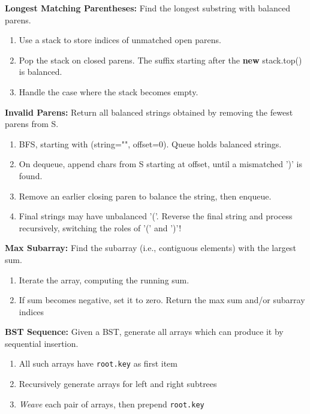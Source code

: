 \documentclass[12pt]{article}
\begin{document}
\vspace{5mm}
\noindent
\textbf{Longest Matching Parentheses:}
Find the longest substring with balanced parens.
\begin{enumerate}
\item Use a stack to store indices of unmatched open parens.
\item Pop the stack on closed parens. The suffix starting after the \textbf{new} stack.top() is balanced.
\item Handle the case where the stack becomes empty.
\end{enumerate}


\vspace{5mm}
\noindent
\textbf{Invalid Parens:}
Return all balanced strings obtained by removing the fewest parens from S.
\begin{enumerate}
\item BFS, starting with (string="", offset=0). Queue holds balanced strings.
\item On dequeue, append chars from S starting at offset, until a mismatched ')' is found.
\item Remove an earlier closing paren to balance the string, then enqueue.
\item Final strings may have unbalanced '('. Reverse the final string and process recursively,
switching the roles of '(' and ')'!
\end{enumerate}


\vspace{5mm}
\noindent
\textbf{Max Subarray:}
Find the subarray (i.e., contiguous elements) with the largest sum.
\begin{enumerate}
\item Iterate the array, computing the running sum.
\item If sum becomes negative, set it to zero. Return the max sum and/or subarray indices
\end{enumerate}


\vspace{5mm}
\noindent
\textbf{BST Sequence:}
Given a BST, generate all arrays which can produce it by sequential insertion.
\begin{enumerate}
\item All such arrays have \texttt{root.key} as first item
\item Recursively generate arrays for left and right subtrees
\item \emph{Weave} each pair of arrays, then prepend \texttt{root.key}
\end{enumerate}
\end{document}
